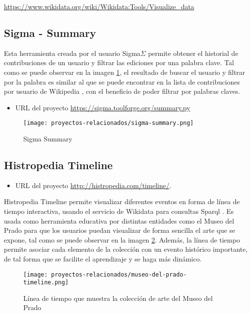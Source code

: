 \url{https://www.wikidata.org/wiki/Wikidata:Tools/Visualize_data}

\subsection{Sigma - Summary}

Esta herramienta creada por el usuario Sigma\(\Sigma\) permite obtener el historial de contribuciones de un usuario y filtrar las ediciones por una palabra clave. Tal como se puede observar en la imagen \ref{fig:sigma_summary}, el resultado de buscar el usuario  y filtrar por la palabra  es similar al que se puede encontrar en la lista de contribuciones por usuario de Wikipedia \cite{UserClarityfiend}, con el beneficio de poder filtrar por palabras claves.

\begin{itemize}
    \item URL del proyecto \url{https://sigma.toolforge.org/summary.py}
\end{itemize}

\begin{figure}[H]
    \centering
    \texttt{[image: proyectos-relacionados/sigma-summary.png]}
    \caption{Sigma Summary}
    \label{fig:sigma_summary}
\end{figure}

\subsection{Histropedia Timeline}

\begin{itemize}
    \item URL del proyecto \url{http://histropedia.com/timeline/}.
\end{itemize}

Histropedia Timeline permite visualizar diferentes eventos en forma de línea de tiempo interactiva, usando el servicio de Wikidata para consultas Sparql \cite{WikidataSparql}. Es usada como herramienta educativa por distintas entidades como el Museo del Prado para que los usuarios puedan visualizar de forma sencilla el arte que se expone, tal como se puede observar en la imagen \ref{fig:museo-de-prado-timeline}. Además, la línea de tiempo permite asociar cada elemento de la colección con un evento histórico importante, de tal forma que se facilite el aprendizaje y se haga más dinámico.

\begin{figure}[H]
    \centering
    \texttt{[image: proyectos-relacionados/museo-del-prado-timeline.png]}
    \caption{Línea de tiempo que muestra la colección de arte del Museo del Prado}
    \label{fig:museo-de-prado-timeline}
\end{figure}



